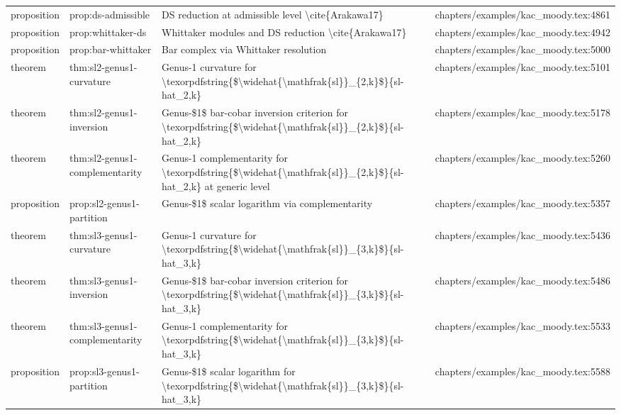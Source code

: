 \documentclass[11pt]{article}
\begin{document}
\begin{longtable}{L{0.10\textwidth}L{0.26\textwidth}L{0.42\textwidth}L{0.22\textwidth}}
proposition & prop:ds-admissible & DS reduction at admissible level \textbackslash{}cite\{Arakawa17\} & chapters/examples/kac\_moody.tex:4861\\
proposition & prop:whittaker-ds & Whittaker modules and DS reduction \textbackslash{}cite\{Arakawa17\} & chapters/examples/kac\_moody.tex:4942\\
proposition & prop:bar-whittaker & Bar complex via Whittaker resolution & chapters/examples/kac\_moody.tex:5000\\
theorem & thm:sl2-genus1-curvature & Genus-1 curvature for \textbackslash{}texorpdfstring\{\$\textbackslash{}widehat\{\textbackslash{}mathfrak\{sl\}\}\_\{2,k\}\$\}\{sl-hat\_2,k\} & chapters/examples/kac\_moody.tex:5101\\
theorem & thm:sl2-genus1-inversion & Genus-\$1\$ bar-cobar inversion criterion for \textbackslash{}texorpdfstring\{\$\textbackslash{}widehat\{\textbackslash{}mathfrak\{sl\}\}\_\{2,k\}\$\}\{sl-hat\_2,k\} & chapters/examples/kac\_moody.tex:5178\\
theorem & thm:sl2-genus1-complementarity & Genus-1 complementarity for \textbackslash{}texorpdfstring\{\$\textbackslash{}widehat\{\textbackslash{}mathfrak\{sl\}\}\_\{2,k\}\$\}\{sl-hat\_2,k\} at generic level & chapters/examples/kac\_moody.tex:5260\\
proposition & prop:sl2-genus1-partition & Genus-\$1\$ scalar logarithm via complementarity & chapters/examples/kac\_moody.tex:5357\\
theorem & thm:sl3-genus1-curvature & Genus-1 curvature for \textbackslash{}texorpdfstring\{\$\textbackslash{}widehat\{\textbackslash{}mathfrak\{sl\}\}\_\{3,k\}\$\}\{sl-hat\_3,k\} & chapters/examples/kac\_moody.tex:5436\\
theorem & thm:sl3-genus1-inversion & Genus-\$1\$ bar-cobar inversion criterion for \textbackslash{}texorpdfstring\{\$\textbackslash{}widehat\{\textbackslash{}mathfrak\{sl\}\}\_\{3,k\}\$\}\{sl-hat\_3,k\} & chapters/examples/kac\_moody.tex:5486\\
theorem & thm:sl3-genus1-complementarity & Genus-1 complementarity for \textbackslash{}texorpdfstring\{\$\textbackslash{}widehat\{\textbackslash{}mathfrak\{sl\}\}\_\{3,k\}\$\}\{sl-hat\_3,k\} & chapters/examples/kac\_moody.tex:5533\\
proposition & prop:sl3-genus1-partition & Genus-\$1\$ scalar logarithm for \textbackslash{}texorpdfstring\{\$\textbackslash{}widehat\{\textbackslash{}mathfrak\{sl\}\}\_\{3,k\}\$\}\{sl-hat\_3,k\} & chapters/examples/kac\_moody.tex:5588\\

\end{longtable}
\end{document}
